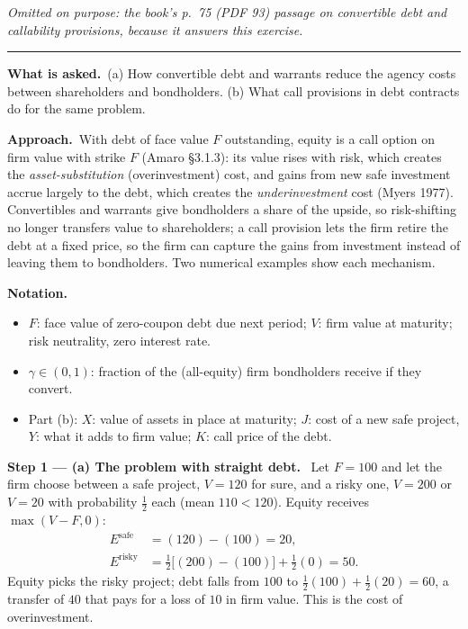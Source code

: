 \documentclass[11pt,a4paper]{article}
\newcommand{\notation}{\par\noindent\textbf{Notation.}}
\newcommand{\step}[2]{\par\medskip\noindent\textbf{Step #1 --- #2.}~}
\newcommand{\asked}{\par\medskip\noindent\textbf{What is asked.}~}
\newcommand{\approach}{\par\smallskip\noindent\textbf{Approach.}~}
\newcommand{\stmtend}{\par\endgroup\nopagebreak\noindent\rule{\linewidth}{0.4pt}\par\medskip}
\begin{document}
\emph{Omitted on purpose: the book's p.~75 (PDF 93) passage on convertible debt and callability
provisions, because it answers this exercise.}
\stmtend

\asked (a) How convertible debt and warrants reduce the agency costs between shareholders and bondholders. (b) What call provisions in debt contracts do for the same problem.

\approach With debt of face value $F$ outstanding, equity is a call option on firm value with strike $F$ (Amaro \S3.1.3): its value rises with risk, which creates the \emph{asset-substitution} (overinvestment) cost, and gains from new safe investment accrue largely to the debt, which creates the \emph{underinvestment} cost (Myers 1977). Convertibles and warrants give bondholders a share of the upside, so risk-shifting no longer transfers value to shareholders; a call provision lets the firm retire the debt at a fixed price, so the firm can capture the gains from investment instead of leaving them to bondholders. Two numerical examples show each mechanism.

\notation
\begin{itemize}
  \item $F$: face value of zero-coupon debt due next period; $V$: firm value at maturity; risk neutrality, zero interest rate.
  \item $\gamma\in(0,1)$: fraction of the (all-equity) firm bondholders receive if they convert.
  \item Part (b): $X$: value of assets in place at maturity; $J$: cost of a new safe project, $Y$: what it adds to firm value; $K$: call price of the debt.
\end{itemize}

\step{1}{(a) The problem with straight debt} Let $F=100$ and let the firm choose between a safe project, $V=120$ for sure, and a risky one, $V=200$ or $V=20$ with probability $\tfrac12$ each (mean $110<120$). Equity receives $\max(V-F,0)$:
\begin{align}
  E^{\text{safe}} &= (120)-(100) = 20, \nonumber\\
  E^{\text{risky}} &= \tfrac12\bigl[(200)-(100)\bigr] + \tfrac12(0) = 50. \nonumber
\end{align}
Equity picks the risky project; debt falls from $100$ to $\tfrac12(100)+\tfrac12(20)=60$, a transfer of $40$ that pays for a loss of $10$ in firm value. This is the cost of overinvestment.
\end{document}
